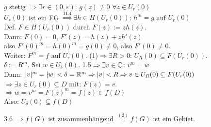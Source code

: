 \documentclass[a4paper,twoside,DIV15,BCOR12mm]{scrbook}
\begin{document}
\begin{beweis}
\begin{liste}
$g$ stetig $\Rightarrow \exists r \in (0,\varepsilon)$: $g(z) \neq 0$ $\forall z \in U_r(0)$\\
$U_r(0)$ ist ein EG $\stackrel{11.4}{\Rightarrow} \exists h \in H(U_r(0))$: $h^m = g$ auf $U_r(0)$\\
Def. $F \in H(U_r(0))$ durch $F(z) := z h(z)$. \\
Dann: $F(0)=0$, $F'(z) = h(z) + zh'(z)$\\
also $F'(0)^m = h(0)^m = g(0) \neq 0$, also $F'(0) \neq 0$.\\
Weiter: $F^m = f$ auf $U_r(0)$. (1)$\Rightarrow \exists R > 0$: $U_R(0) \subseteq F(U_r(0))$.\\
$\delta := R^m$. Sei $w \in U_{\delta}(0)$. 1.5 $\Rightarrow \exists v \in \mathbb{C}$: $v^m = w$\\
Dann: $|v|^m = |w| < \delta = \mathbb{R}^m \Rightarrow |v| <R \Rightarrow v \in U_R(0) \subseteq F(U_r(0))$\\
$\Rightarrow \exists z \in U_r(0) \subseteq D$ mit: $F(z) = v$.\\
$\Rightarrow w = v^m = F(z)^m = f(z) \in f(D)$\\
Also: $U_{\delta}(0) \subseteq f(D)$
\item 3.6 $\Rightarrow f(G)$ ist zusammenhängend $\stackrel{(2)}{=} f(G)$ ist ein Gebiet.

\end{liste}
\end{beweis}
\end{document}
